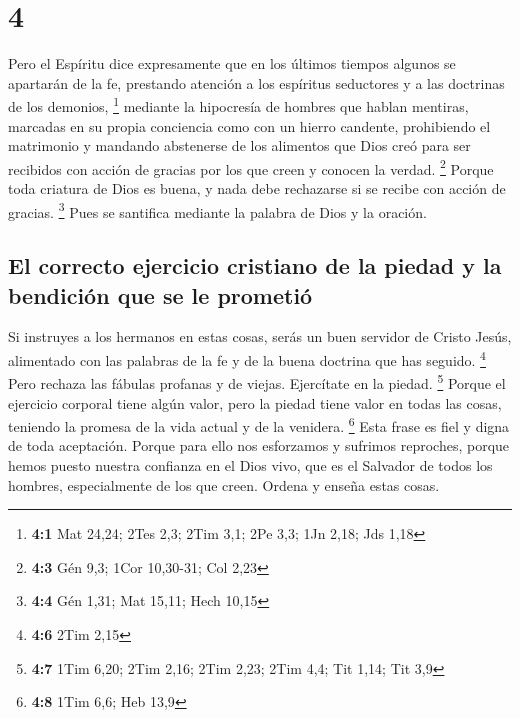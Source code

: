 \hypertarget{section-3}{%
\section{4}\label{section-3}}

 Pero el Espíritu dice expresamente que en los últimos
tiempos algunos se apartarán de la fe, prestando atención a los
espíritus seductores y a las doctrinas de los demonios, \footnote{\textbf{4:1}
  Mat 24,24; 2Tes 2,3; 2Tim 3,1; 2Pe 3,3; 1Jn 2,18; Jds 1,18}
 mediante la hipocresía de hombres que hablan mentiras,
marcadas en su propia conciencia como con un hierro candente,
 prohibiendo el matrimonio y mandando abstenerse de los
alimentos que Dios creó para ser recibidos con acción de gracias por los
que creen y conocen la verdad. \footnote{\textbf{4:3} Gén 9,3; 1Cor
  10,30-31; Col 2,23}  Porque toda criatura de Dios es
buena, y nada debe rechazarse si se recibe con acción de gracias.
\footnote{\textbf{4:4} Gén 1,31; Mat 15,11; Hech 10,15} 
Pues se santifica mediante la palabra de Dios y la oración.

\hypertarget{el-correcto-ejercicio-cristiano-de-la-piedad-y-la-bendiciuxf3n-que-se-le-prometiuxf3}{%
\subsection{El correcto ejercicio cristiano de la piedad y la bendición
que se le
prometió}\label{el-correcto-ejercicio-cristiano-de-la-piedad-y-la-bendiciuxf3n-que-se-le-prometiuxf3}}

 Si instruyes a los hermanos en estas cosas, serás un buen
servidor de Cristo Jesús, alimentado con las palabras de la fe y de la
buena doctrina que has seguido. \footnote{\textbf{4:6} 2Tim 2,15}
 Pero rechaza las fábulas profanas y de viejas. Ejercítate
en la piedad. \footnote{\textbf{4:7} 1Tim 6,20; 2Tim 2,16; 2Tim 2,23;
  2Tim 4,4; Tit 1,14; Tit 3,9}  Porque el ejercicio
corporal tiene algún valor, pero la piedad tiene valor en todas las
cosas, teniendo la promesa de la vida actual y de la venidera.
\footnote{\textbf{4:8} 1Tim 6,6; Heb 13,9}  Esta frase es
fiel y digna de toda aceptación.  Porque para ello nos
esforzamos y sufrimos reproches, porque hemos puesto nuestra confianza
en el Dios vivo, que es el Salvador de todos los hombres, especialmente
de los que creen.  Ordena y enseña estas cosas.

